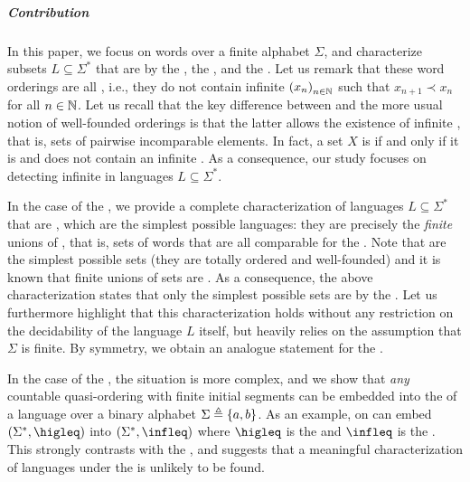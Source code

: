\subparagraph{Contribution} In this paper, we focus on words over a finite
alphabet $\Sigma$, and characterize subsets $L \subseteq \Sigma^*$ that are
 by the , the ,
and the . Let us remark that these word orderings are all
, i.e., they do not contain infinite  $\seqof{x_n}$ such that $x_{n+1} \prec x_n$ for all $n \in \mathbb{N}$.
Let us recall that the key difference between  and the
more usual notion of well-founded orderings is that the latter allows the
existence of infinite , that is, sets of pairwise
incomparable elements. In fact, a set $X$ is  if and
only if it is  and does not contain an infinite 
\cite{KRU72}.  As a consequence, our study focuses on detecting infinite
 in languages $L \subseteq \Sigma^*$.

In the case of the , we provide a complete characterization
of languages $L \subseteq \Sigma^*$ that are , which are
the simplest possible languages: they are precisely the \emph{finite} unions of
, that is, sets of words that are all comparable for the
. Note that  are the simplest possible
 sets (they are totally ordered and well-founded) and it
is known that finite unions of  sets are
. As a consequence, the above characterization states
that only the simplest possible  sets are
 by the . Let us furthermore
highlight that this characterization holds without any restriction on the
decidability of the language $L$ itself, but heavily relies on the assumption
that $\Sigma$ is finite. By symmetry, we obtain an analogue statement for the
.

In the case of the , the situation is more complex, and we
show that \emph{any} countable quasi-ordering with finite initial segments can
be embedded into the  of a language over a binary alphabet
$\Sigma \triangleq \{ a,b \}$. As an example, on can embed $(\Sigma^*, \higleq)$
into $(\Sigma^*, \infleq)$ where $\higleq$ is the  and
$\infleq$ is the . This strongly contrasts with the
, and suggests that a meaningful characterization of
 languages under the  is unlikely to
be found. 

